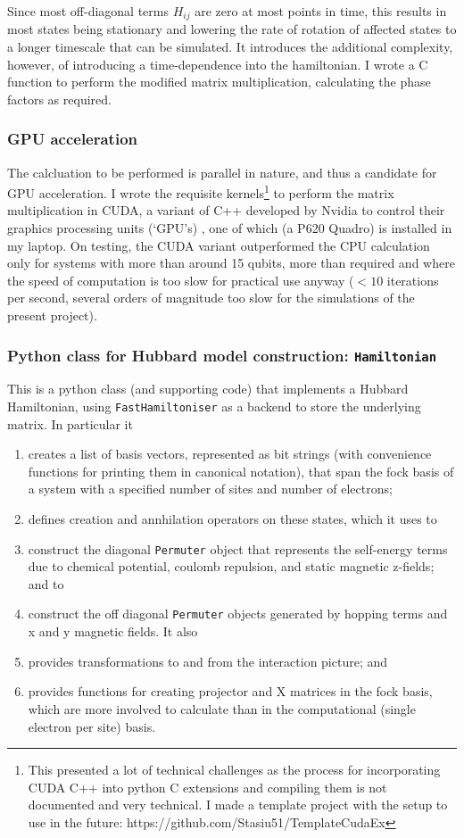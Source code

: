 \documentclass{report}
\begin{document}
\begin{appendices}
Since most off-diagonal terms $H_{ij}$ are zero at most points in time, this results in most states being stationary and lowering the rate of rotation of affected states to a longer timescale that can be simulated. It introduces the additional complexity, however, of introducing a time-dependence into the hamiltonian. I wrote a C function to perform the modified matrix multiplication, calculating the phase factors as required.

\subsubsection{GPU acceleration}
The calcluation to be performed is parallel in nature, and thus a candidate for GPU acceleration. I wrote the requisite kernels\footnote{This presented a lot of technical challenges as the process for incorporating CUDA C++ into python C extensions and compiling them is not documented and very technical. I made a template project with the setup to use in the future: https://github.com/Stasiu51/TemplateCudaEx} to perform the matrix multiplication in CUDA, a variant of C++ developed by Nvidia to control their graphics processing units (`GPU's) \cite{cuda}, one of which (a P620 Quadro) is installed in my laptop. On testing, the CUDA variant outperformed the CPU calculation only for systems with more than around 15 qubits, more than required and where the speed of computation is too slow for practical use anyway ($<10$ iterations per second, several orders of magnitude too slow for the simulations of the present project).

\subsubsection{Python class for Hubbard model construction: \texttt{Hamiltonian}}
This is a python class (and supporting code) that implements a Hubbard Hamiltonian, using \texttt{FastHamiltoniser} as a backend to store the underlying matrix. In particular it
\begin{enumerate}
    \item creates a list of basis vectors, represented as bit strings (with convenience functions for printing them in canonical notation), that span the fock basis of a system with a specified number of sites and number of electrons;
    \item defines creation and annhilation operators on these states, which it uses to
    \item construct the diagonal \texttt{Permuter} object that represents the self-energy terms due to chemical potential, coulomb repulsion, and static magnetic z-fields; and to
    \item construct the off diagonal \texttt{Permuter} objects generated by hopping terms and x and y magnetic fields. It also
    \item provides transformations to and from the interaction picture; and
    \item provides functions for creating projector and X matrices in the fock basis, which are more involved to calculate than in the computational (single electron per site) basis. 
\end{enumerate}


\end{appendices}
\end{document}
